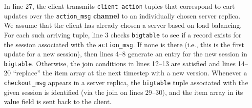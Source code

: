In line 27, the client transmits \texttt{client\_action} tuples that correspond to cart
updates over the \texttt{action\_msg} \textbf{channel} to an individually
chosen server replica.  We assume that the client has already chosen a server
based on load balancing.
For each such arriving
tuple, line 3
checks \texttt{bigtable} to see if a record exists for the
session associated with the \texttt{action\_msg}.  If none is there (i.e., this
is the first update for a new session), then lines 4--8 generate an entry for
the new session in \texttt{bigtable}.  Otherwise, the join conditions in lines 12--13 are
satisfied and lines 14--20 ``replace'' the item array
at the next timestep with a new version.  
Whenever a \texttt{checkout\_msg} appears in a server replica, the 
\texttt{bigtable} tuple associated with the given session is identified (via the join
on lines 29--30), and the item array in its value field is sent back to the client.  


